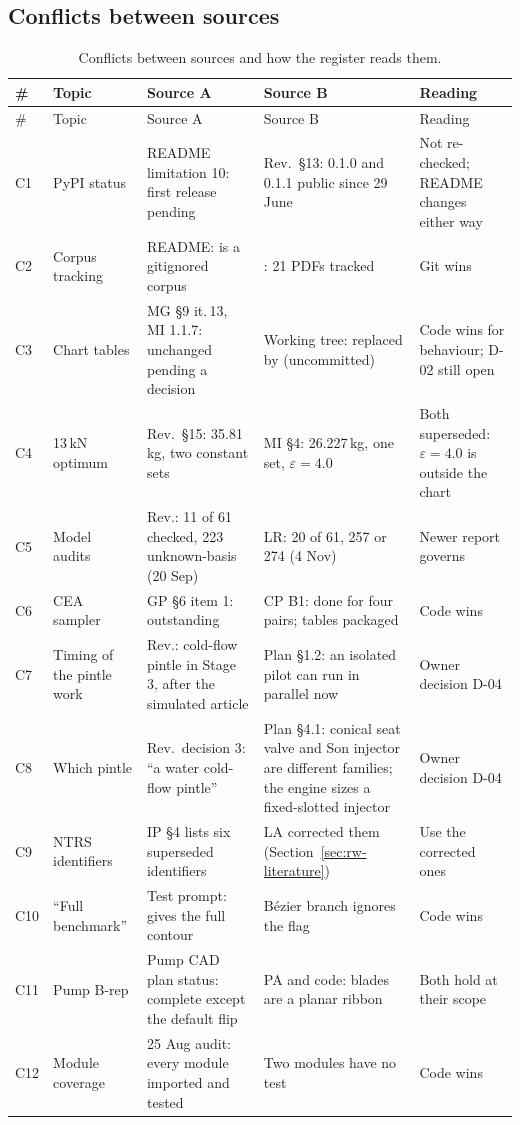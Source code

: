 \subsection{Conflicts between sources}\label{sec:rw-conflicts}

{\rwsmall
\begin{longtable}{@{}P{0.6cm}P{2.1cm}P{4.3cm}P{4.3cm}P{4.3cm}@{}}
\caption{Conflicts between sources and how the register reads them.}\label{tab:rw-conflicts}\\
\toprule
\# & Topic & Source A & Source B & Reading \\
\midrule
\endfirsthead
\toprule
\# & Topic & Source A & Source B & Reading \\
\midrule
\endhead
C1 & PyPI status & README limitation 10: first release pending & Rev.\ \S13: 0.1.0 and 0.1.1 public since 29 June & Not re-checked; README changes either way \\
C2 & Corpus tracking & README:  is a gitignored corpus & : 21 PDFs tracked & Git wins \\
C3 & Chart tables & MG \S9 it.\,13, MI 1.1.7: unchanged pending a decision & Working tree: replaced by  (uncommitted) & Code wins for behaviour; D-02 still open \\
C4 & 13\,kN optimum & Rev.\ \S15: 35.81\,kg, two constant sets & MI \S4: 26.227\,kg, one set, $\varepsilon = 4.0$ & Both superseded: $\varepsilon = 4.0$ is outside the chart \\
C5 & Model audits & Rev.: 11 of 61 checked, 223 unknown-basis (20 Sep) & LR: 20 of 61, 257 or 274 (4 Nov) & Newer report governs \\
C6 & CEA sampler & GP \S6 item 1: outstanding & CP B1: done for four pairs; tables packaged & Code wins \\
C7 & Timing of the pintle work & Rev.: cold-flow pintle in Stage 3, after the simulated article & Plan \S1.2: an isolated pilot can run in parallel now & Owner decision D-04 \\
C8 & Which pintle & Rev.\ decision 3: ``a water cold-flow pintle'' & Plan \S4.1: conical seat valve and Son injector are different families; the engine sizes a fixed-slotted injector & Owner decision D-04 \\
C9 & NTRS identifiers & IP \S4 lists six superseded identifiers & LA corrected them (Section~\ref{sec:rw-literature}) & Use the corrected ones \\
C10 & ``Full benchmark'' & Test prompt:  gives the full contour & B\'ezier branch ignores the flag & Code wins \\
C11 & Pump B-rep & Pump CAD plan status: complete except the default flip & PA and code: blades are a planar ribbon & Both hold at their scope \\
C12 & Module coverage & 25 Aug audit: every module imported and tested & Two modules have no test & Code wins \\
\bottomrule
\end{longtable}
}


